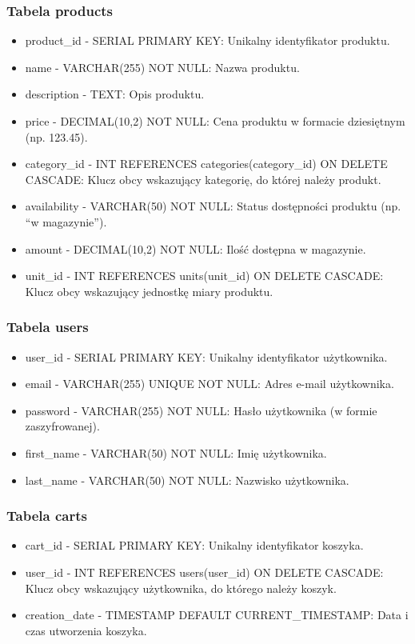 \subsubsection{Tabela products}
\begin{itemize}
\item product\_id - SERIAL PRIMARY KEY: Unikalny identyfikator produktu.
\item name - VARCHAR(255) NOT NULL: Nazwa produktu.
\item description - TEXT: Opis produktu.
\item price - DECIMAL(10,2) NOT NULL: Cena produktu w formacie dziesiętnym (np. 123.45).
\item category\_id - INT REFERENCES categories(category\_id) ON DELETE CASCADE: Klucz obcy wskazujący kategorię, do której należy produkt.
\item availability - VARCHAR(50) NOT NULL: Status dostępności produktu (np. “w magazynie”).
\item amount - DECIMAL(10,2) NOT NULL: Ilość dostępna w magazynie.
\item unit\_id - INT REFERENCES units(unit\_id) ON DELETE CASCADE: Klucz obcy wskazujący jednostkę miary produktu.
\end{itemize}

\subsubsection{Tabela users}
\begin{itemize}
\item user\_id - SERIAL PRIMARY KEY: Unikalny identyfikator użytkownika.
\item email - VARCHAR(255) UNIQUE NOT NULL: Adres e-mail użytkownika.
\item password - VARCHAR(255) NOT NULL: Hasło użytkownika (w formie zaszyfrowanej).
\item first\_name - VARCHAR(50) NOT NULL: Imię użytkownika.
\item last\_name - VARCHAR(50) NOT NULL: Nazwisko użytkownika.
\end{itemize}

\subsubsection{Tabela carts}
\begin{itemize}
\item cart\_id - SERIAL PRIMARY KEY: Unikalny identyfikator koszyka.
\item user\_id - INT REFERENCES users(user\_id) ON DELETE CASCADE: Klucz obcy wskazujący użytkownika, do którego należy koszyk.
\item creation\_date - TIMESTAMP DEFAULT CURRENT\_TIMESTAMP: Data i czas utworzenia koszyka.
\end{itemize}

